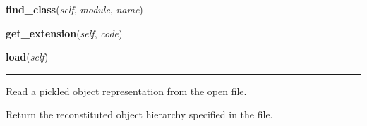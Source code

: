     \label{pickle:Unpickler:find_class}

    \vspace{0.5ex}

\hspace{.8\funcindent}\begin{boxedminipage}{\funcwidth}

    \raggedright \textbf{find\_class}(\textit{self}, \textit{module}, \textit{name})

\setlength{\parskip}{2ex}
\setlength{\parskip}{1ex}
    \end{boxedminipage}

    \label{pickle:Unpickler:get_extension}

    \vspace{0.5ex}

\hspace{.8\funcindent}\begin{boxedminipage}{\funcwidth}

    \raggedright \textbf{get\_extension}(\textit{self}, \textit{code})

\setlength{\parskip}{2ex}
\setlength{\parskip}{1ex}
    \end{boxedminipage}

    \label{pickle:Unpickler:load}

    \vspace{0.5ex}

\hspace{.8\funcindent}\begin{boxedminipage}{\funcwidth}

    \raggedright \textbf{load}(\textit{self})

    \vspace{-1.5ex}

    \rule{\textwidth}{0.5\fboxrule}
\setlength{\parskip}{2ex}
    Read a pickled object representation from the open file.

    Return the reconstituted object hierarchy specified in the file.

\setlength{\parskip}{1ex}
    \end{boxedminipage}

    \label{pickle:Unpickler:load_append}

    \vspace{0.5ex}

